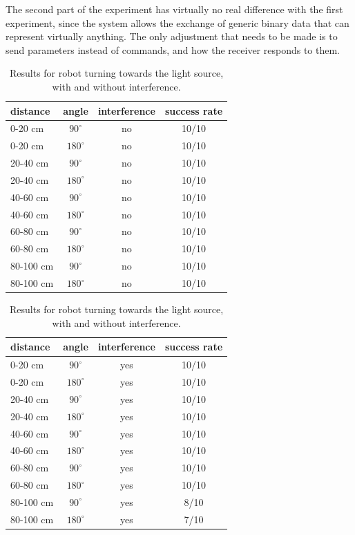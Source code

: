 The second part of the experiment has virtually no real difference with the first experiment, since the system allows the exchange of generic binary data that can represent virtually anything.
The only adjustment that needs to be made is to send parameters instead of commands, and how the receiver responds to them.
%
%
\newline
\begin{table}[hbt]
\centering
  \begin{tabular}{l c c c |}
  distance & angle & interference & success rate\\
    \hline
    0-20 cm & $90^{\circ}$ & no & 10/10\\
    0-20 cm &  $180^{\circ}$ & no & 10/10\\
   20-40 cm &  $90^{\circ}$ & no &10/10 \\
   20-40 cm &  $180^{\circ}$ & no &10/10 \\
   40-60 cm &  $90^{\circ}$ & no & 10/10\\
   40-60 cm &  $180^{\circ}$ & no & 10/10\\
   60-80 cm &  $90^{\circ}$ & no & 10/10\\
   60-80 cm &  $180^{\circ}$ & no & 10/10\\
  80-100 cm &  $90^{\circ}$ & no & 10/10\\
  80-100 cm &  $180^{\circ}$ & no & 10/10\\
  \end{tabular}
  \begin{tabular}{| l c c c}
   distance & angle & interference & success rate\\
    \hline
    0-20 cm & $90^{\circ}$ & yes & 10/10\\
    0-20 cm &  $180^{\circ}$ & yes & 10/10\\
   20-40 cm &  $90^{\circ}$ & yes &10/10 \\
   20-40 cm &  $180^{\circ}$ & yes &10/10 \\
   40-60 cm &  $90^{\circ}$ & yes & 10/10\\
   40-60 cm &  $180^{\circ}$ & yes & 10/10\\
   60-80 cm &  $90^{\circ}$ & yes & 10/10\\
   60-80 cm &  $180^{\circ}$ & yes & 10/10\\
  80-100 cm &  $90^{\circ}$ & yes & 8/10\\
  80-100 cm &  $180^{\circ}$ & yes & 7/10\\
  \end{tabular}
  \caption{Results for robot turning towards the light source, with and without interference.}
  \label{tab:turning}
\end{table}


